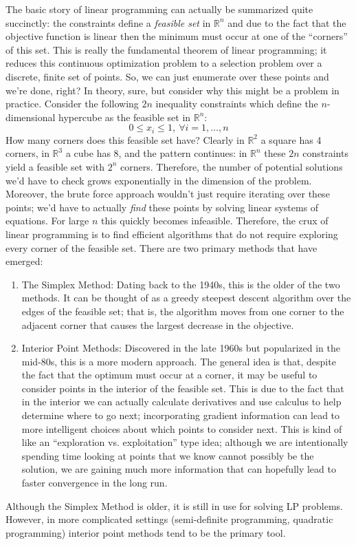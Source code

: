 \documentclass[12pt]{article}
\newcommand{\R}{\mathcal{R}}
\def\R{\mathbb{R}}
\begin{document}
The basic story of linear programming can actually be summarized quite succinctly: the constraints define a \textit{feasible set} in $\R^n$ and due to the fact that the objective function is linear then 
the minimum must occur at one of the ``corners'' of this set. This is really the fundamental theorem of linear programming; it reduces this continuous optimization
problem to a selection problem over a discrete, finite set of points. So, we can just enumerate over these points and we're done, right? In theory, sure, but consider 
why this might be a problem in practice. Consider the following $2n$ inequality constraints which define the $n$-dimensional hypercube as the feasible set in $\R^n$:
\[0 \leq x_i \leq 1, \ \forall i = 1, \dots, n\]
How many corners does this feasible set have? Clearly in $\R^2$ a square has 4 corners, in $\R^3$ a cube has 8, and the pattern continues: in $\R^n$ these $2n$
constraints yield a feasible set with $2^n$ corners. Therefore, the number of potential solutions we'd have to check grows exponentially in the dimension of the 
problem. Moreover, the brute force approach wouldn't just require iterating over these points; we'd have to actually \textit{find} these points by solving linear systems 
of equations. For large $n$ this quickly becomes infeasible. Therefore, the crux of linear programming is to find efficient algorithms that do not require exploring every
corner of the feasible set. There are two primary methods that have emerged: 
\begin{enumerate} 
\item The Simplex Method: Dating back to the 1940s, this is the older of the two methods. It can be thought of as a greedy steepest descent algorithm over the edges of the feasible
set; that is, the algorithm moves from one corner to the adjacent corner that causes the largest decrease in the objective. 
\item Interior Point Methods: Discovered in the late 1960s but popularized in the mid-80s, this is a more modern approach. The general idea is that, despite the fact that the optimum 
must occur at a corner, it may be useful to consider points in the interior of the feasible set. This is due to the fact that in the interior we can actually calculate derivatives and use 
calculus to help determine where to go next; incorporating gradient information can lead to more intelligent choices about which points to consider next. This is kind of like an 
``exploration vs. exploitation'' type idea; although we are intentionally spending time looking at points that we know cannot possibly be the solution, we are gaining much more 
information that can hopefully lead to faster convergence in the long run. 
\end{enumerate}
Although the Simplex Method is older, it is still in use for solving LP problems. However, in more complicated settings (semi-definite programming, quadratic programming) interior 
point methods tend to be the primary tool. 
\end{document}
